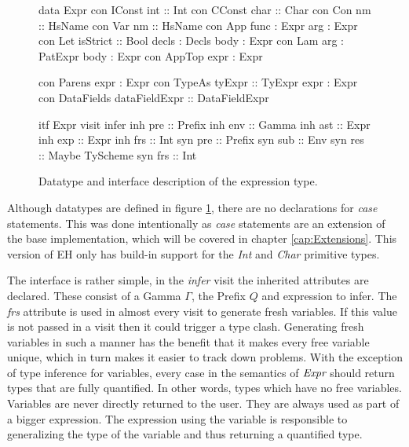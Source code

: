 \begin{figure}[H]
\begin{minipage}[t]{0.4\linewidth}
\begin{code}
data Expr
  con IConst
    int            :: Int
  con CConst       
    char           :: Char
  con Con          
    nm             :: HsName
  con Var          
    nm             :: HsName
  con App          
    func           :  Expr
    arg            :  Expr
  con Let          
    isStrict       :: Bool
    decls          :  Decls
    body           :  Expr
  con Lam          
    arg            :  PatExpr
    body           :  Expr
  con AppTop       
    expr           :  Expr
\end{code}
\end{minipage}
\begin{minipage}[t]{0.6\linewidth}
\begin{code}
  con Parens
    expr           :  Expr
  con TypeAs       
    tyExpr         :: TyExpr
    expr           :  Expr
  con DataFields   
    dataFieldExpr  :: DataFieldExpr

itf Expr
  visit infer
    inh pre  :: Prefix
    inh env  :: Gamma
    inh ast  :: Expr
    inh exp  :: Expr
    inh frs  :: Int
    syn pre  :: Prefix
    syn sub  :: Env
    syn res  :: Maybe TyScheme
    syn frs  :: Int
\end{code}
\end{minipage}
\caption{Datatype and interface description of the expression type.}
\label{abs:fig:expr}
\end{figure}

Although datatypes are defined in figure \ref{abs:fig:expr}, there are no declarations for \emph{case} statements. This was done intentionally as \emph{case} statements are an extension of the base implementation, which will be covered in chapter \ref{cap:Extensions}. This version of EH only has build-in support for the \emph{Int} and \emph{Char} primitive types.

The interface is rather simple, in the \emph{infer} visit the inherited attributes are declared. These consist of a Gamma $\Gamma$, the Prefix $Q$ and expression to infer. The \emph{frs} attribute is used in almost every visit to generate fresh variables. If this value is not passed in a visit then it could trigger a type clash. Generating fresh variables in such a manner has the benefit that it makes every free variable unique, which in turn makes it easier to track down problems. With the exception of type inference for variables, every case in the semantics of $\emph{Expr}$ should return types that are fully quantified. In other words, types which have no free variables. Variables are never directly returned to the user. They are always used as part of a bigger expression. The expression using the variable is responsible to generalizing the type of the variable and thus returning a quantified type.

